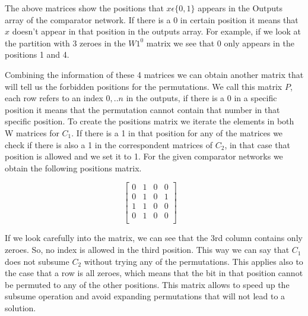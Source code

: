 \documentclass[../main.tex]{subfiles}
\begin{document}
	The above matrices show the positions that $x \epsilon \{0, 1\}$ appears in the Outputs array of the comparator network. If there is a 0 in certain position it means that $x$ doesn't appear in that position in the outputs array. For example, if we look at the partition with 3 zeroes in the $W1^0$ matrix we see that 0 only appears in the positions 1 and 4.
	
	Combining the information of these 4 matrices we can obtain another matrix that will tell us the forbidden positions for the permutations. We call this matrix $P$, each row refers to an index $0,..n$ in the outputs, if there is a 0 in a specific position it means that the permutation cannot contain that number in that specific position. To create the positions matrix we iterate the elements in both W matrices for $C_1$. If there is a 1 in that position for any of the matrices we check if there is also a 1 in the correspondent matrices of $C_2$, in that case that position is allowed and we set it to 1. For the given comparator networks we obtain the following positions matrix.
	
	$$
	\begin{bmatrix} 
		0 & 1 & 0 & 0 \\
		0 & 1 & 0 & 1 \\
		1 & 1 & 0 & 0 \\
		0 & 1 & 0 & 0 \\
	\end{bmatrix}
	\quad
	$$
	
	If we look carefully into the matrix, we can see that the 3rd column contains only zeroes. So, no index is allowed in the third position. This way we can say that $C_1$ does not subsume $C_2$ without trying any of the permutations. This applies also to the case that a row is all zeroes, which means that the bit in that position cannot be permuted to any of the other positions. This matrix allows to speed up the subsume operation and avoid expanding permutations that will not lead to a solution.
\end{document}
